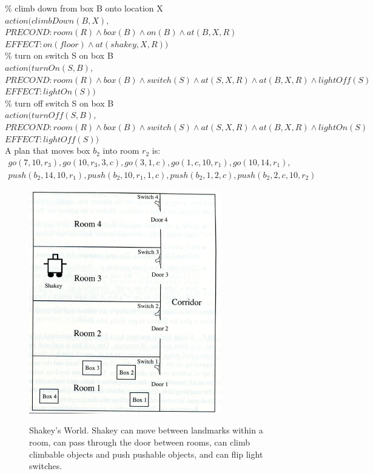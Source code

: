 \documentclass{article}%
\begin{document}
\begin{enumerate}
	\% climb down from box B onto location X\\
	$action( climbDown(B,X), $ \\
	$PRECOND: room(R) \wedge box(B) \wedge on(B) \wedge at(B, X, R)$\\
	$EFFECT: on(floor) \wedge at(shakey, X, R)) $\\
	
	\% turn on switch S on box B \\
	$action( turnOn(S,B), $ \\
	$PRECOND: room(R) \wedge box(B) \wedge switch(S) \wedge at(S,X,R) \wedge at(B,X,R) \wedge lightOff(S) $\\
	$EFFECT: lightOn(S)) $\\
	
	\% turn off switch S on box B \\
	$action( turnOff(S,B), $ \\
	$PRECOND: room(R) \wedge box(B) \wedge switch(S) \wedge at(S,X,R) \wedge at(B,X,R) \wedge lightOn(S) $\\
	$EFFECT: lightOff(S)) $\\
	
	A plan that moves box $b_2$ into room $r_2$ is: \\
	\begin{multline*}
	go(7,10,r_3), go(10,r_3,3,c), go(3,1,c),go(1,c,10,r_1),go(10,14,r_1),\\
	push(b_2,14,10,r_1),push(b_2,10,r_1,1,c),push(b_2,1,2,c),push(b_2,2,c,10,r_2)
	\end{multline*}
	
	 
	 
\begin{figure}[h]
\begin{center}
  \includegraphics[scale=0.5]{shakey.png}
  \label{fig:shakey}
  \caption{Shakey's World. Shakey can move between landmarks within a room, can pass through the door between rooms, can climb climbable objects and push pushable objects, and can flip light switches.}
\end{center}
\end{figure} 

\end{enumerate}
\end{document}
